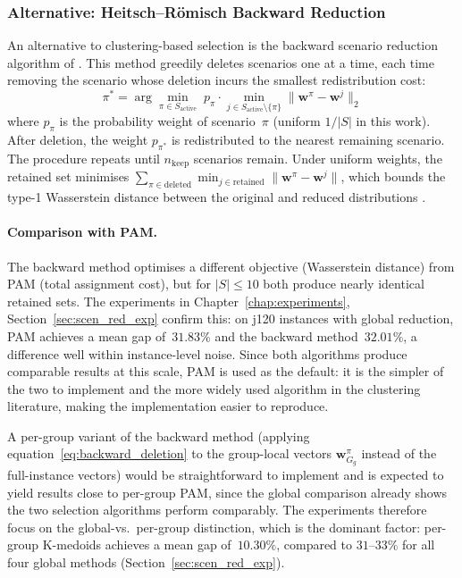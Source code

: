 \subsubsection*{Alternative: Heitsch--R\"omisch Backward Reduction}

An alternative to clustering-based selection is the backward
scenario reduction algorithm of \textcite{Heitsch2003}. This
method greedily deletes scenarios one at a time, each time
removing the scenario whose deletion incurs the smallest
redistribution cost:
\begin{equation}
    \pi^* = \arg\min_{\pi \in S_{\mathrm{active}}}
    \; p_{\pi} \cdot
    \min_{j \in S_{\mathrm{active}} \setminus \{\pi\}}
    \bigl\|\mathbf{w}^{\pi} - \mathbf{w}^{j}\bigr\|_2
    \label{eq:backward_deletion}
\end{equation}
where $p_{\pi}$ is the probability weight of scenario~$\pi$
(uniform $1/|S|$ in this work). After deletion, the weight
$p_{\pi^*}$ is redistributed to the nearest remaining scenario.
The procedure repeats until $n_{\mathrm{keep}}$ scenarios
remain. Under uniform weights, the retained set minimises
$\sum_{\pi \in \text{deleted}} \min_{j \in \text{retained}}
\|\mathbf{w}^{\pi} - \mathbf{w}^{j}\|$, which bounds the
type-1 Wasserstein distance between the original and reduced
distributions \parencite{Heitsch2003}.

\paragraph{Comparison with PAM.}
The backward method optimises a different objective
(Wasserstein distance) from PAM (total assignment cost), but
for $|S| \leq 10$ both produce nearly identical retained sets.
The experiments in Chapter~\ref{chap:experiments},
Section~\ref{sec:scen_red_exp} confirm this: on j120 instances
with global reduction, PAM achieves a mean gap of~$31.83\%$
and the backward method~$32.01\%$, a difference well within
instance-level noise. Since both algorithms produce comparable results at this scale,
PAM is used as the default: it is the simpler of the two to
implement and the more widely used algorithm in the clustering
literature, making the implementation easier to reproduce.

A per-group variant of the backward method (applying
equation~\eqref{eq:backward_deletion} to the group-local
vectors $\mathbf{w}_{G_g}^{\pi}$ instead of the full-instance
vectors) would be straightforward to implement and is expected
to yield results close to per-group PAM, since the global
comparison already shows the two selection algorithms perform
comparably. The experiments therefore focus on the global-vs.\
per-group distinction, which is the dominant factor: per-group
K-medoids achieves a mean gap of~$10.30\%$, compared to
$31$--$33\%$ for all four global methods
(Section~\ref{sec:scen_red_exp}).

